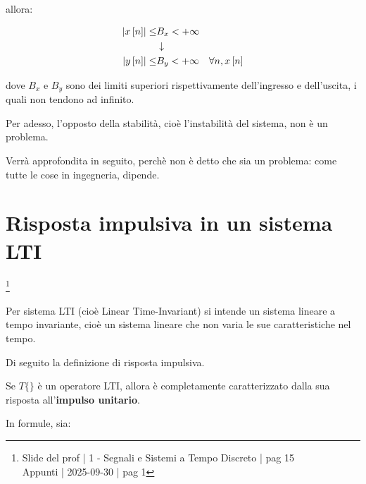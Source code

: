 allora: 

{
    \Large 
    \begin{equation}
        \begin{split}
            \abs{x \left[ n\right]} 
            \leq
            &B_x 
            < 
            + \infty
            \\
            &\downarrow
            \\
            \abs{y \left[ n\right]} 
            \leq
            &B_y 
            < 
            + \infty
            \quad
            \forall n, x \left[ n\right]
        \end{split}
    \end{equation}
}

dove $B_x$ e $B_y$ sono dei limiti superiori rispettivamente dell'ingresso e dell'uscita, 
i quali non tendono ad infinito. \newline 

\begin{tcolorbox}

Per adesso, l'opposto della stabilità, cioè l'instabilità del sistema, non è un problema. \newline 

Verrà approfondita in seguito, perchè non è detto che sia un problema: 
come tutte le cose in ingegneria, dipende.
\end{tcolorbox}

\newpage 

\section{Risposta impulsiva in un sistema LTI}

\footnote{ 
    Slide del prof | 1 - Segnali e Sistemi a Tempo Discreto | pag 15\\
    Appunti | 2025-09-30 | pag 1
}

Per sistema LTI (cioè Linear Time-Invariant) si intende 
un sistema lineare a tempo invariante, cioè un sistema lineare che non varia le sue caratteristiche nel tempo. \newline 


Di seguito la definizione di risposta impulsiva. \newline 

Se $T \{ \}$ è un operatore LTI, 
allora è completamente caratterizzato dalla sua risposta all'\textbf{impulso unitario}. \newline 

In formule, sia: 

